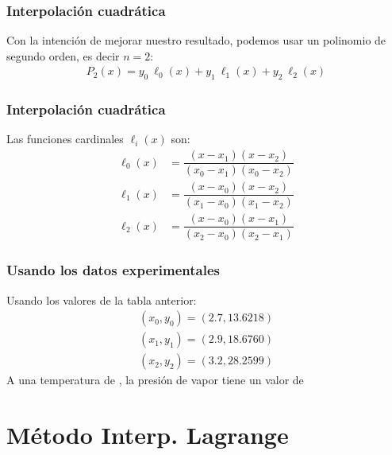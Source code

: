 \documentclass[12pt]{beamer}
\begin{document}
\begin{frame}
\frametitle{Interpolación cuadrática}
Con la intención de mejorar nuestro resultado, podemos usar un polinomio de segundo orden, es decir $n = 2$:
\pause
\begin{align*}
P_{2} (x) = y_{0} \: \ell_{0} (x) + y_{1} \: \ell_{1} (x) + y_{2} \: \ell_{2} (x)
\end{align*}
\end{frame}
\begin{frame}
\frametitle{Interpolación cuadrática}
Las funciones cardinales $\ell_{i}(x)$ son:
\pause
\begin{align*}
\ell_{0} (x) &= \dfrac{(x - x_{1})(x - x_{2})}{(x_{0} - x_{1})(x_{0} - x_{2})} \\[1em]
\ell_{1} (x) &= \dfrac{(x - x_{0})(x - x_{2})}{(x_{1} - x_{0})(x_{1} - x_{2})} \\[1em]
\ell_{2} (x) &= \dfrac{(x - x_{0})(x - x_{1})}{(x_{2} - x_{0})(x_{2} - x_{1})} 
\end{align*}
\end{frame}
\begin{frame}
\frametitle{Usando los datos experimentales}
Usando los valores de la tabla anterior:
\pause
\begin{eqnarray*}
(x_{0}, y_{0}) = (2.7, 13.6218) \\
(x_{1}, y_{1}) = (2.9, 18.6760) \\
(x_{2}, y_{2}) = (3.2, 28.2599)
\end{eqnarray*}
\pause
A una temperatura de , la presión de vapor tiene un valor de 
\\
\bigskip
{}
\end{frame}

\section{Método Interp. Lagrange}
\end{document}
